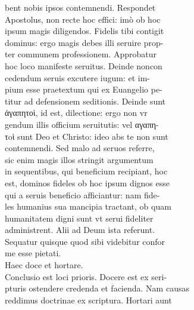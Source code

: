 \documentclass{article}
\begin{document}
\begin{pages}
                bent nobis ipsos contemnendi. Respondet \\
                Apostolus, non recte hoc effici: imò ob hoc \\
                ipsum magis diligendos. Fidelis tibi contigit \\
                dominus: ergo magis debes illi seruire prop- \\
                ter communem professionem. Approbatur \\
                hoc loco manifeste seruitus. Deinde noncon \\
                cedendum seruis excutere iugum: et im- \\
                pium esse praetextum qui ex Euangelio pe- \\
                titur ad defensionem seditionis. Deinde sunt \\
                ἀγαπητοὶ, id est, dilectione: ergo non vr \\
                gendum illis officium seruitutis: vel αγαπη- \\
                τoὶ sunt Deo et Christo: ideo abs te non sunt \\
                contemnendi. Sed malo ad seruos referre, \\
                sic enim magis illos stringit argumentum \\
                in sequentibus, qui beneficium recipiant, hoc \\
                est, dominos fideles ob hoc ipsum dignos esse \\
                qui a seruis beneficio afficiantur: nam fide- \\
                les humanius sua mancipia tractant, ob quam \\
                humanitatem digni sunt vt serui fideliter \\
                administrent. Alii ad Deum ista referunt. \\
                Sequatur quisque quod sibi videbitur confor \\
                me esse pietati. \\
                Haec doce et hortare. \\
                Conclusio est loci prioris. Docere est ex seri- \\
                pturis ostendere credenda et facienda. Nam causas \\
                reddimus doctrinae ex scriptura. Hortari aunt \\

\end{pages}
\end{document}
